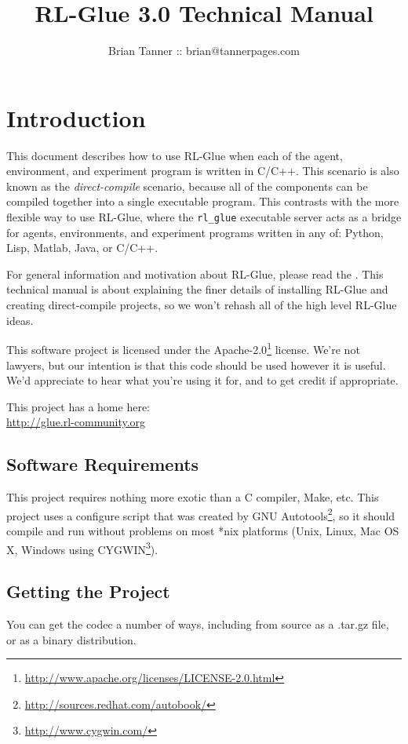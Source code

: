 \documentclass[11pt]{article}
\title{RL-Glue 3.0 Technical Manual }
\author{Brian Tanner :: brian@tannerpages.com}
\date{}
\begin{document}
\maketitle
\tableofcontents

\section{Introduction}

This document describes how to use RL-Glue when each of the agent, environment, and experiment program is written in C/C++.  This scenario is also known as the \textit{direct-compile} scenario, because all of the
components can be compiled together into a single executable program.  This contrasts with the more flexible way to use RL-Glue, where the \texttt{rl\_glue} executable server acts as a bridge for agents, environments, and experiment 
programs written in any of: Python, Lisp, Matlab, Java, or C/C++.  

For general information and motivation about RL-Glue, please read the .  This technical manual is about explaining the finer details of installing RL-Glue and creating direct-compile projects, 
so we won't rehash all of the high level RL-Glue ideas.

This software project is licensed under the Apache-2.0\footnote{\url{http://www.apache.org/licenses/LICENSE-2.0.html}} license. We're not lawyers, but our intention is that this code 
should be used however it is useful.  We'd appreciate to hear what you're using it for, and to get credit if appropriate.

This project has a home here:\\
\url{http://glue.rl-community.org}



\subsection{Software Requirements}
This project requires nothing more exotic than a C compiler, Make, etc.  This project uses a configure script that was created by GNU 
Autotools\footnote{\url{http://sources.redhat.com/autobook/}}, so it should compile and run without problems 
on most *nix platforms (Unix, Linux, Mac OS X, Windows using CYGWIN\footnote{\url{http://www.cygwin.com/}}). 

\subsection{Getting the Project}
You can get the codec a number of ways, including from source as a .tar.gz file, or as a binary distribution.
\end{document}
